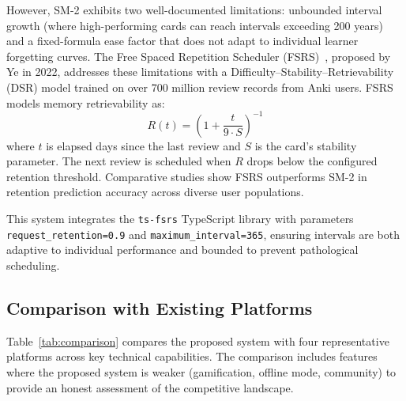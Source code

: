 \documentclass{IEEEtran}
\begin{document}
However, SM-2 exhibits two well-documented limitations: unbounded interval growth (where high-performing cards can reach intervals exceeding 200 years) and a fixed-formula ease factor that does not adapt to individual learner forgetting curves. The Free Spaced Repetition Scheduler (FSRS)~\cite{fsrs}, proposed by Ye in 2022, addresses these limitations with a Difficulty--Stability--Retrievability (DSR) model trained on over 700 million review records from Anki users. FSRS models memory retrievability as:
\begin{equation}
R(t) = \left(1 + \frac{t}{9 \cdot S}\right)^{-1}
\label{eq:retrievability}
\end{equation}
where $t$ is elapsed days since the last review and $S$ is the card's stability parameter. The next review is scheduled when $R$ drops below the configured retention threshold. Comparative studies show FSRS outperforms SM-2 in retention prediction accuracy across diverse user populations.

This system integrates the \texttt{ts-fsrs} TypeScript library with parameters \texttt{request\_retention=0.9} and \texttt{maximum\_interval=365}, ensuring intervals are both adaptive to individual performance and bounded to prevent pathological scheduling.

\subsection{Comparison with Existing Platforms}

Table~\ref{tab:comparison} compares the proposed system with four representative platforms across key technical capabilities. The comparison includes features where the proposed system is weaker (gamification, offline mode, community) to provide an honest assessment of the competitive landscape.
\end{document}
